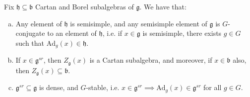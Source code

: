 \documentclass[11pt]{article}
\theoremstyle{definition}
\numberwithin{equation}{section} %
\begin{document}
\begin{lemma}
    Fix $\mathfrak{h}\subseteq\mathfrak{b}$ Cartan and Borel subalgebras of $\mathfrak{g}$. We have that:
    
    \begin{enumerate}[(a)]
        \item Any element of $\mathfrak{h}$ is semisimple, and any semisimple element of $\mathfrak{g}$ is $G$-conjugate to an element of $\mathfrak{h}$, i.e. if $x\in \mathfrak{g}$ is semisimple, there exists $g\in G$ such that $\mathrm{Ad}_g(x)\in \mathfrak{h}$. 

        \item If $x\in \mathfrak{g}^{sr}$, then $Z_\mathfrak{g}(x)$ is a Cartan subalgebra, and moreover, if $x\in \mathfrak{b}$ also, then $Z_\mathfrak{g}(x)\subseteq \mathfrak{b}$.

        \item $\mathfrak{g}^{sr}\subseteq \mathfrak{g}$ is dense, and $G$-stable, i.e. $x\in \mathfrak{g}^{sr} \implies \mathrm{Ad}_g(x)\in \mathfrak{g}^{sr}$ for all $g\in G$.
    \end{enumerate} 
\end{lemma}

\noindent  
\end{document}

